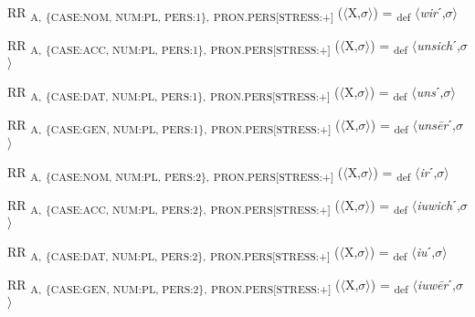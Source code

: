 {\begin{exe}
 RR \textsubscript{A,} \textsubscript{\{CASE:NOM, NUM:PL, PERS:1\},} \textsubscript{PRON.PERS[STRESS:+]} ($\langle$X,$\sigma $$\rangle$) = \textsubscript{def} $\langle$\textit{wir}ˊ,$\sigma $$\rangle$
\end{exe}

\begin{exe}
 RR \textsubscript{A,} \textsubscript{\{CASE:ACC, NUM:PL, PERS:1\},} \textsubscript{PRON.PERS[STRESS:+]} ($\langle$X,$\sigma $$\rangle$) = \textsubscript{def} $\langle$\textit{unsich}ˊ,$\sigma $$\rangle$
\end{exe}

\begin{exe}
 RR \textsubscript{A,} \textsubscript{\{CASE:DAT, NUM:PL, PERS:1\},} \textsubscript{PRON.PERS[STRESS:+]} ($\langle$X,$\sigma $$\rangle$) = \textsubscript{def} $\langle$\textit{uns}ˊ,$\sigma $$\rangle$
\end{exe}

\begin{exe}
 RR \textsubscript{A,} \textsubscript{\{CASE:GEN, NUM:PL, PERS:1\},} \textsubscript{PRON.PERS[STRESS:+]} ($\langle$X,$\sigma $$\rangle$) = \textsubscript{def} $\langle$\textit{uns\=er}ˊ,$\sigma $$\rangle$
\end{exe}

\begin{exe}
 RR \textsubscript{A,} \textsubscript{\{CASE:NOM, NUM:PL, PERS:2\},} \textsubscript{PRON.PERS[STRESS:+]} ($\langle$X,$\sigma $$\rangle$) = \textsubscript{def} $\langle$\textit{ir}ˊ,$\sigma $$\rangle$
\end{exe}

\begin{exe}
 RR \textsubscript{A,} \textsubscript{\{CASE:ACC, NUM:PL, PERS:2\},} \textsubscript{PRON.PERS[STRESS:+]} ($\langle$X,$\sigma $$\rangle$) = \textsubscript{def} $\langle$\textit{iuwich}ˊ,$\sigma $$\rangle$
\end{exe}

\begin{exe}
 RR \textsubscript{A,} \textsubscript{\{CASE:DAT, NUM:PL, PERS:2\},} \textsubscript{PRON.PERS[STRESS:+]} ($\langle$X,$\sigma $$\rangle$) = \textsubscript{def} $\langle$\textit{iu}ˊ,$\sigma $$\rangle$
\end{exe}

\begin{exe}
 RR \textsubscript{A,} \textsubscript{\{CASE:GEN, NUM:PL, PERS:2\},} \textsubscript{PRON.PERS[STRESS:+]} ($\langle$X,$\sigma $$\rangle$) = \textsubscript{def} $\langle$\textit{iuw\=er}ˊ,$\sigma $$\rangle$
\end{exe}

}
